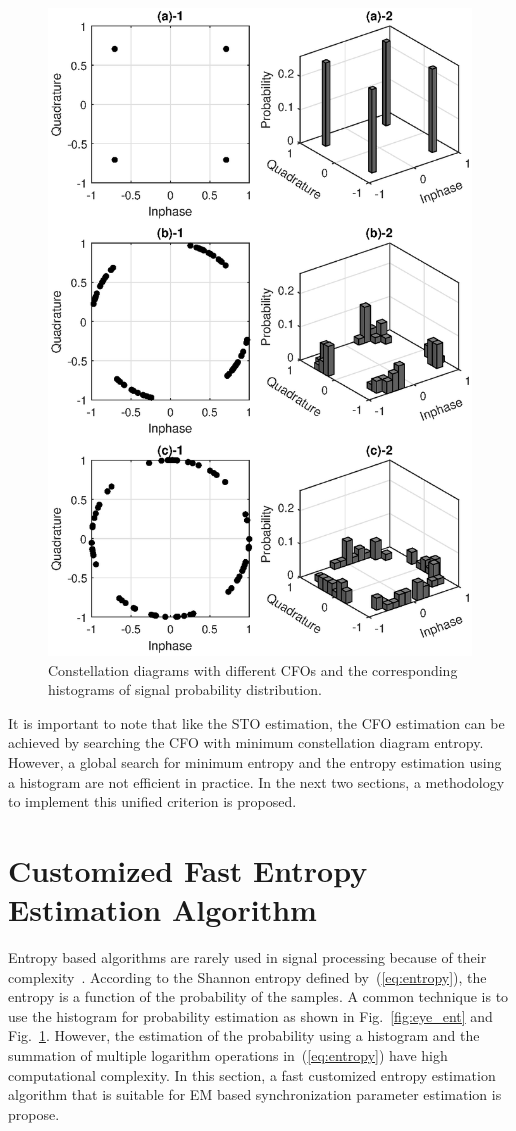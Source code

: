 \documentclass[12pt, draftclsnofoot, onecolumn]{IEEEtran}
\begin{document}
\begin{figure}[htbp]
\centering
\includegraphics[width=3.5 in]{pic/const_hst-k.eps}
\caption{Constellation diagrams with different CFOs and the corresponding histograms of signal probability distribution.}
\label{fig:const_hst} 
\end{figure}

It is important to note that like the STO estimation, the CFO estimation can be achieved by searching the CFO with minimum constellation diagram entropy.
However, a global search for minimum entropy and the entropy estimation using a histogram are not efficient in practice.
In the next two sections, a methodology to implement this unified criterion is proposed.

\section{Customized Fast Entropy Estimation Algorithm}
\label{sec:cust_entp}
Entropy based algorithms are rarely used in signal processing because of their complexity~\cite{Bercher2000}.
According to the Shannon entropy defined by~(\ref{eq:entropy}), the entropy is a function of the probability of the samples.
A common technique is to use the histogram for probability estimation as shown in Fig.~\ref{fig:eye_ent} and Fig.~\ref{fig:const_hst}.
However, the estimation of the probability using a histogram and the summation of multiple logarithm operations  in~(\ref{eq:entropy}) have high computational complexity.
In this section, a fast customized entropy estimation algorithm that is suitable for EM based synchronization parameter estimation is propose. 
\end{document}

